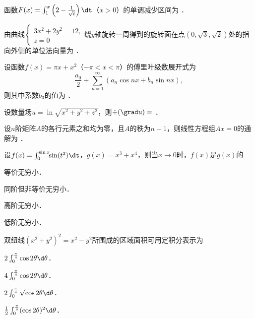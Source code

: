 \documentclass[plain,noanswer,medmath]{../../template/jnuexam}
\begin{document}




\begin{problem}
函数$F(x) = \int_1^x \left(2 - \frac{1}{\sqrt{t}} \right)\dt$（$x > 0$）的单调减少区间为 \fillin{}．
\end{problem}


\begin{problem}
由曲线$\begin{cases}
  3x^2 + 2y^2 = 12, \\
  z = 0
\end{cases}$绕$y$轴旋转一周得到的旋转面在点$(0,\sqrt{3},\sqrt{2})$处的指向外侧的单位法向量为 \fillin{}．
\end{problem}


\begin{problem}
设函数$f(x) = \pi x + x^2$（$- \pi < x < \pi$）的傅里叶级数展开式为
$$\frac{a_0}{2} + \sum_{n = 1}^{\infty}(a_n\cos nx + b_n\sin nx),$$
则其中系数$b_3$的值为 \fillin{}．
\end{problem}


\begin{problem}
设数量场$u = \ln \sqrt{x^2 + y^2 + z^2}$，则$\div(\grad u) =$ \fillin{}．
\end{problem}


\begin{problem}
设$n$阶矩阵$A$的各行元素之和均为零，且$A$的秩为$n - 1$，则线性方程组$Ax = 0$的通解为 \fillin{}．
\end{problem}




\begin{problem}
设$f(x) = \int_0^{\sin x} \!\!\sin(t^2)\dt$，$g(x) = x^3 + x^4$，则当$x \to 0$时，$f(x)$是$g(x)$的\pickout{}
\begin{abcd}
\item 等价无穷小．				
\item 同阶但非等价无穷小． 
\item 高阶无穷小．				
\item 低阶无穷小．
\end{abcd}
\end{problem}


\begin{problem}
双纽线$(x^2 + y^2)^2 = x^2 - y^2$所围成的区域面积可用定积分表示为\pickout{}
\begin{abcd}
\item $2\int_0^{\frac{\pi}{4}} \cos 2\theta \d\theta$．					
\item $4\int_0^{\frac{\pi}{4}} \cos 2\theta \d\theta$．
\item $2\int_0^{\frac{\pi}{4}} \sqrt{\cos 2\theta} \d\theta$．				
\item $\frac{1}{2}\int_0^{\frac{\pi}{4}} (\cos 2\theta)^2 \d\theta$．
\end{abcd}
\end{problem}
\end{document}
